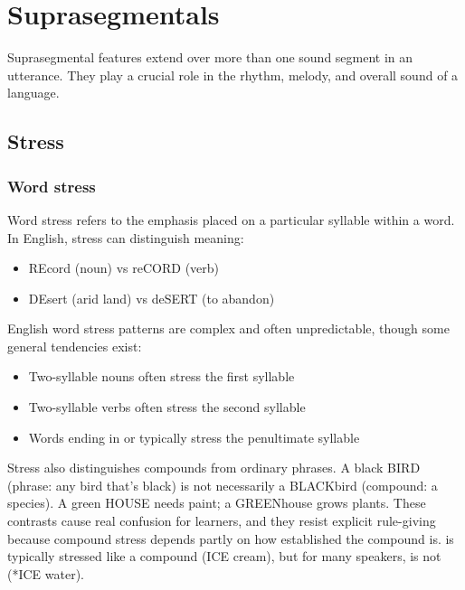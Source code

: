 \section{Suprasegmentals}

Suprasegmental features extend over more than one sound segment in an utterance. They play a crucial role in the rhythm, melody, and overall sound of a language.

\subsection{Stress}\label{sec:stress}

\subsubsection{Word stress}

Word stress refers to the emphasis placed on a particular syllable within a word. In English, stress can distinguish meaning:

\begin{itemize}[noitemsep]
    \item REcord (noun) vs reCORD (verb)
    \item DEsert (arid land) vs deSERT (to abandon)
\end{itemize}

English word stress patterns are complex and often unpredictable, though some general tendencies exist:

\begin{itemize}[noitemsep]
    \item Two-syllable nouns often stress the first syllable
    \item Two-syllable verbs often stress the second syllable
    \item Words ending in  or  typically stress the penultimate syllable
\end{itemize}

Stress also distinguishes compounds from ordinary phrases. A black BIRD (phrase: any bird that's black) is not necessarily a BLACKbird (compound: a species). A green HOUSE needs paint; a GREENhouse grows plants. These contrasts cause real confusion for learners, and they resist explicit rule-giving because compound stress depends partly on how established the compound is.  is typically stressed like a compound (ICE cream), but for many speakers,  is not (*ICE water).

